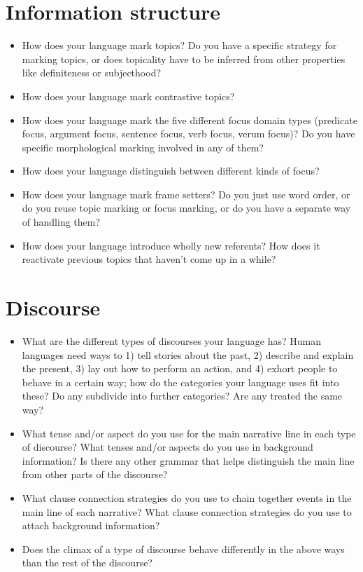 \documentclass{article}
\begin{document}
\section{Information structure}
\begin{itemize}
  \item How does your language mark topics? Do you have a specific strategy for marking topics, or does topicality have to be inferred from other properties like definiteness or subjecthood?
  \item How does your language mark contrastive topics?
  \item How does your language mark the five different focus domain types (predicate focus, argument focus, sentence focus, verb focus, verum focus)? Do you have specific morphological marking involved in any of them?
  \item How does your language distinguish between different kinds of focus?
  \item How does your language mark frame setters? Do you just use word order, or do you reuse topic marking or focus marking, or do you have a separate way of handling them?
  \item How does your language introduce wholly new referents? How does it reactivate previous topics that haven't come up in a while?
\end{itemize}

\section{Discourse}%
\begin{itemize}
  \item What are the different types of discourses your language has? Human languages need ways to 1) tell stories about the past, 2) describe and explain the present, 3) lay out how to perform an action, and 4) exhort people to behave in a certain way; how do the categories your language uses fit into these? Do any subdivide into further categories? Are any treated the same way?
  \item What tense and/or aspect do you use for the main narrative line in each type of discourse? What tenses and/or aspects do you use in background information? Is there any other grammar that helps distinguish the main line from other parts of the discourse?
  \item What clause connection strategies do you use to chain together events in the main line of each narrative? What clause connection strategies do you use to attach background information?
  \item Does the climax of a type of discourse behave differently in the above ways than the rest of the discourse?
\end{itemize}
\end{document}
